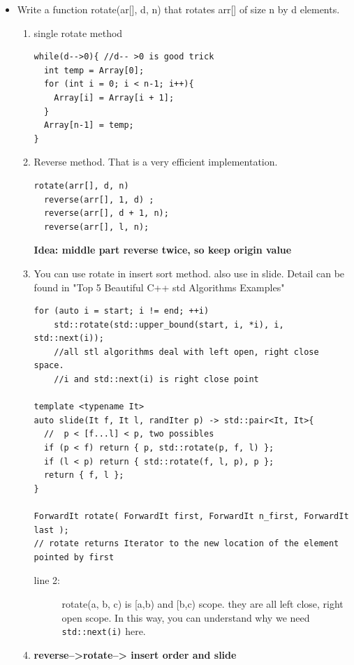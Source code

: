 \documentclass[a4paper,11pt,twoside]{book}
\begin{document}
\begin{itemize}
	\item Write a function rotate(ar[], d, n) that rotates arr[] of size n by d elements.
\begin{enumerate}
	\item single rotate method
\begin{lstlisting}[breaklines]
while(d-->0){ //d-- >0 is good trick
  int temp = Array[0];
  for (int i = 0; i < n-1; i++){
    Array[i] = Array[i + 1];
  }
  Array[n-1] = temp;
}
\end{lstlisting}

	\item Reverse method. That is a very efficient implementation.
\begin{lstlisting}[breaklines]
rotate(arr[], d, n)
  reverse(arr[], 1, d) ;
  reverse(arr[], d + 1, n);
  reverse(arr[], l, n);
\end{lstlisting}
\textbf{Idea: middle part reverse twice, so keep origin value}


	\item You can use rotate in insert sort method. also use in slide. Detail can be found in "Top 5 Beautiful C++ std Algorithms Examples"
\begin{lstlisting}[breaklines, basicstyle=\scriptsize]
for (auto i = start; i != end; ++i)
	std::rotate(std::upper_bound(start, i, *i), i, std::next(i));  
	//all stl algorithms deal with left open, right close space. 
	//i and std::next(i) is right close point                               

template <typename It> 
auto slide(It f, It l, randIter p) -> std::pair<It, It>{
  //  p < [f...l] < p, two possibles 
  if (p < f) return { p, std::rotate(p, f, l) };
  if (l < p) return { std::rotate(f, l, p), p };
  return { f, l };
}

ForwardIt rotate( ForwardIt first, ForwardIt n_first, ForwardIt last );
// rotate returns Iterator to the new location of the element pointed by first
\end{lstlisting}
\begin{description}
	\item[line 2:] rotate(a, b, c) is [a,b) and [b,c) scope. they are all left close, right open scope. In this way, you can understand why we need \texttt{std::next(i)} here.
\end{description}

	\item \textbf{reverse-->rotate--> insert order and slide}

\end{enumerate}


\end{itemize}
\end{document}
